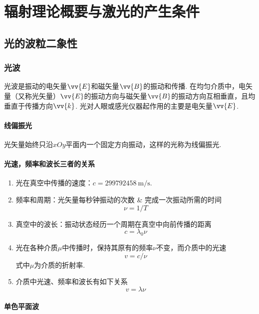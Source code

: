 \chapter{辐射理论概要与激光的产生条件}
\section{光的波粒二象性}
\subsection{光波}
光波是振动的电矢量$\vv{E}$和磁矢量$\vv{B}$的振动和传播. 在均匀介质中，电矢量（又称光矢量）$\vv{E}$的振动方向与磁矢量$\vv{B}$的振动方向互相垂直，且均垂直于传播方向$\vv{k}$. 光对人眼或感光仪器起作用的主要是电矢量$\vv{E}$.

\subsubsection{线偏振光}
光矢量始终只沿$xOy$平面内一个固定方向振动，这样的光称为线偏振光.
\subsubsection{光速，频率和波长三者的关系}
\begin{enumerate}
	\item 光在真空中传播的速度：$c=\qty{299792458}{\m/\s}$.
	\item 频率和周期：光矢量每秒钟振动的次数 \& 完成一次振动所需的时间
	\begin{equation}
		\nu=1/T
		\label{1.1}
	\end{equation}
	\item 真空中的波长：振动状态经历一个周期在真空中向前传播的距离
	\begin{equation}
		c=\lambda_0\nu
	\end{equation}
	\item 光在各种介质$\mu$中传播时，保持其原有的频率$\nu$不变，而介质中的光速
	\begin{equation}
		v=c/\nu
	\end{equation}
	式中$\mu$为介质的折射率.
	\item 介质中光速、频率和波长有如下关系
	\begin{equation}
		v=\lambda\nu
	\end{equation}
\end{enumerate}
\subsubsection{单色平面波}

